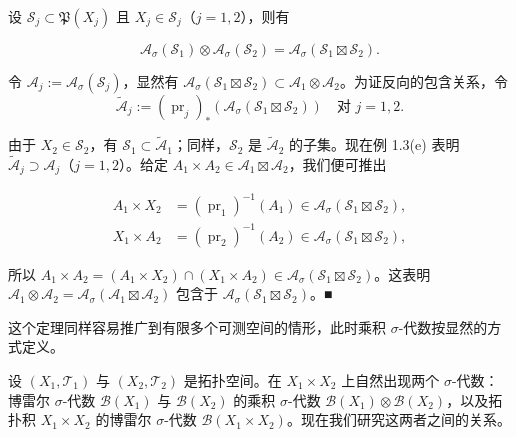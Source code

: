 \begin{proposition}

设 $ \mathcal{S}_j \subset \mathfrak{P}(X_j) $ 且 $ X_j \in \mathcal{S}_j $（$ j = 1, 2 $），则有

\[
\mathcal{A}_\sigma(\mathcal{S}_1) \otimes \mathcal{A}_\sigma(\mathcal{S}_2) = \mathcal{A}_\sigma(\mathcal{S}_1 \boxtimes \mathcal{S}_2) .
\]

\proofhead
令 $ \mathcal{A}_j := \mathcal{A}_\sigma(\mathcal{S}_j) $，显然有 $ \mathcal{A}_\sigma(\mathcal{S}_1 \boxtimes \mathcal{S}_2) \subset \mathcal{A}_1 \otimes \mathcal{A}_2 $。为证反向的包含关系，令
\[
\widetilde{\mathcal{A}}_j := (\operatorname{pr}_j)_*\left( \mathcal{A}_\sigma(\mathcal{S}_1 \boxtimes \mathcal{S}_2) \right) \quad \text{对 } j = 1, 2 .
\]

由于 $ X_2 \in \mathcal{S}_2 $，有 $ \mathcal{S}_1 \subset \widetilde{\mathcal{A}}_1 $；同样，$ \mathcal{S}_2 $ 是 $ \widetilde{\mathcal{A}}_2 $ 的子集。现在例 1.3(e) 表明 $ \widetilde{\mathcal{A}}_j \supset \mathcal{A}_j $（$ j = 1, 2 $）。给定 $ A_1 \times A_2 \in \mathcal{A}_1 \boxtimes \mathcal{A}_2 $，我们便可推出

\begin{equation*}
\begin{aligned}
A_1 \times X_2 &= (\operatorname{pr}_1)^{-1}(A_1) \in \mathcal{A}_\sigma(\mathcal{S}_1 \boxtimes \mathcal{S}_2) , \\ X_1 \times A_2 &= (\operatorname{pr}_2)^{-1}(A_2) \in \mathcal{A}_\sigma(\mathcal{S}_1 \boxtimes \mathcal{S}_2) ,
\end{aligned}
\end{equation*}

所以 $ A_1 \times A_2 = (A_1 \times X_2) \cap (X_1 \times A_2) \in \mathcal{A}_\sigma(\mathcal{S}_1 \boxtimes \mathcal{S}_2) $。这表明 $ \mathcal{A}_1 \otimes \mathcal{A}_2 = \mathcal{A}_\sigma(\mathcal{A}_1 \boxtimes \mathcal{A}_2) $ 包含于 $ \mathcal{A}_\sigma(\mathcal{S}_1 \boxtimes \mathcal{S}_2) $。\nobreak\hspace{0.35em}■

\end{proposition}

这个定理同样容易推广到有限多个可测空间的情形，此时乘积 $ \sigma $-代数按显然的方式定义。

设 $ (X_1, \mathcal{T}_1) $ 与 $ (X_2, \mathcal{T}_2) $ 是拓扑空间。在 $ X_1 \times X_2 $ 上自然出现两个 $ \sigma $-代数：博雷尔 $ \sigma $-代数 $ \mathcal{B}(X_1) $ 与 $ \mathcal{B}(X_2) $ 的乘积 $ \sigma $-代数 $ \mathcal{B}(X_1) \otimes \mathcal{B}(X_2) $，以及拓扑积 $ X_1 \times X_2 $ 的博雷尔 $ \sigma $-代数 $ \mathcal{B}(X_1 \times X_2) $。现在我们研究这两者之间的关系。

